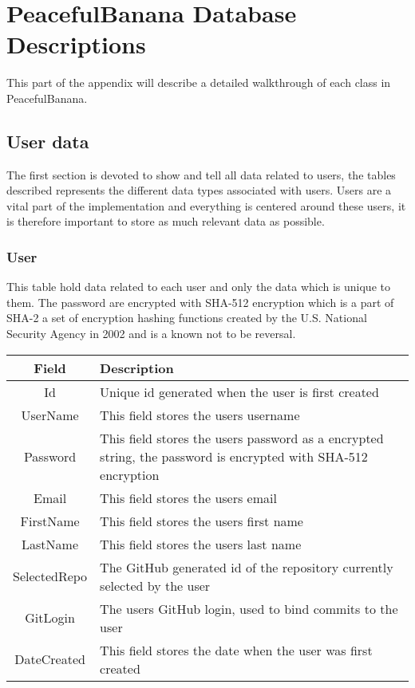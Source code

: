 \newpage
\thispagestyle{empty}
\mbox{}
\chapter{PeacefulBanana Database Descriptions}
This part of the appendix will describe a detailed walkthrough of each class in PeacefulBanana. 
\section{User data}
The first section is devoted to show and tell all data related to users, the tables described represents the different data types associated with users. Users are a vital part of the implementation and everything is centered around these users, it is therefore important to store as much relevant data as possible. \\

\subsection*{User}
This table hold data related to each user and only the data which is unique to them.
The password are encrypted with SHA-512 encryption which is a part of SHA-2 a set of encryption hashing functions created by the U.S. National Security Agency in 2002 and is a known not to be reversal.\\

\vspace{0.5cm}
\begin{tabularx}{\linewidth}{| c | X |}
    \hline
    \rowcolor[gray]{0.8}
    \textbf{Field} & \textbf{Description} \\
    \hline
    Id & Unique id generated when the user is first created\\ \hline
    UserName & This field stores the users username\\ \hline
   	Password & This field stores the users password as a encrypted string, the password is encrypted with SHA-512 encryption\\ \hline
    Email & This field stores the users email\\ \hline
    FirstName & This field stores the users first name\\ \hline
    LastName & This field stores the users last name\\ \hline
    SelectedRepo & The GitHub generated id of the repository currently selected by the user\\ \hline
    GitLogin & The users GitHub login, used to bind commits to the user\\ \hline
    DateCreated & This field stores the date when the user was first created\\
    \hline
\end{tabularx}
\vspace{0.5cm}

